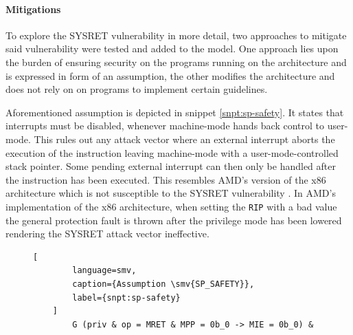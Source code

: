 \paragraph{Mitigations}

To explore the SYSRET vulnerability in more detail, two approaches to mitigate said vulnerability were tested and added to the model.
One approach lies upon the burden of ensuring security on the programs running on the architecture and is expressed in form of an assumption, the other modifies the architecture and does not rely on on programs to implement certain guidelines.

Aforementioned assumption is depicted in snippet \ref{snpt:sp-safety}.
It states that interrupts must be disabled, whenever machine-mode hands back control to user-mode.
This rules out any attack vector where an external interrupt aborts the execution of the  instruction leaving machine-mode with a user-mode-controlled stack pointer.
Some pending external interrupt can then only be handled after the  instruction has been executed.
This resembles AMD's version of the x86 architecture which is not susceptible to the SYSRET vulnerability \cite{Dunlap19}.
In AMD's implementation of the x86 architecture, when setting the \lstinline{RIP} with a bad value the general protection fault is thrown after the privilege mode has been lowered rendering the SYSRET attack vector ineffective.

\begin{figure}
    \begin{lstlisting}[
        language=smv,
        caption={Assumption \smv{SP_SAFETY}},
        label={snpt:sp-safety}
    ]
        G (priv & op = MRET & MPP = 0b_0 -> MIE = 0b_0) &
    \end{lstlisting}
\end{figure}


